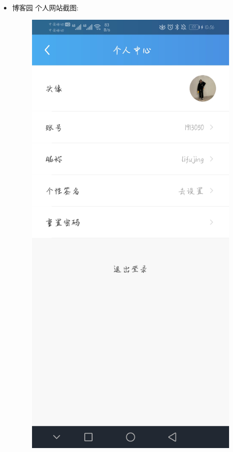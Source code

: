 \documentclass{article}
\begin{document}
\begin{itemize}
   \item 博客园 个人网站截图:\par
   \begin{figure}[h!]
   	\centering
   	\includegraphics[scale=0.1]{k}

\end{figure}
\end{itemize}
\end{document}
